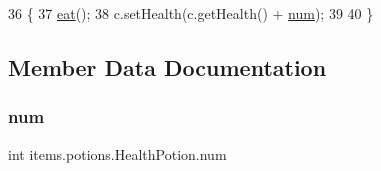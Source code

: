 \begin{DoxyCode}
36                                \{
37         \mbox{\hyperlink{classitems_1_1_potion_a33ab3390826ef43ddfa94fc812e53afe}{eat}}();
38         c.setHealth(c.getHealth() + \mbox{\hyperlink{classitems_1_1potions_1_1_health_potion_a0d748e2dc730a38bab9f68ef71003a03}{num}});
39 
40     \}
\end{DoxyCode}


\subsection{Member Data Documentation}
\mbox{\label{classitems_1_1potions_1_1_health_potion_a0d748e2dc730a38bab9f68ef71003a03}} 
\subsubsection{\texorpdfstring{num}{num}}
{\footnotesize\ttfamily int items.\+potions.\+Health\+Potion.\+num\hspace{0.3cm}{\ttfamily [private]}}

